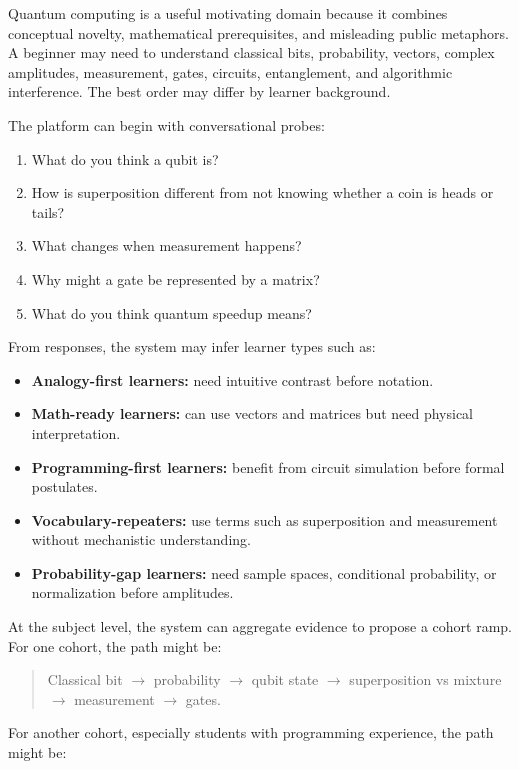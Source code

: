 \documentclass[11pt]{article}
\begin{document}
Quantum computing is a useful motivating domain because it combines conceptual novelty, mathematical prerequisites, and misleading public metaphors. A beginner may need to understand classical bits, probability, vectors, complex amplitudes, measurement, gates, circuits, entanglement, and algorithmic interference. The best order may differ by learner background.

The platform can begin with conversational probes:

\begin{enumerate}[leftmargin=*]
  \item What do you think a qubit is?
  \item How is superposition different from not knowing whether a coin is heads or tails?
  \item What changes when measurement happens?
  \item Why might a gate be represented by a matrix?
  \item What do you think quantum speedup means?
\end{enumerate}

From responses, the system may infer learner types such as:

\begin{itemize}[leftmargin=*]
  \item \textbf{Analogy-first learners:} need intuitive contrast before notation.
  \item \textbf{Math-ready learners:} can use vectors and matrices but need physical interpretation.
  \item \textbf{Programming-first learners:} benefit from circuit simulation before formal postulates.
  \item \textbf{Vocabulary-repeaters:} use terms such as superposition and measurement without mechanistic understanding.
  \item \textbf{Probability-gap learners:} need sample spaces, conditional probability, or normalization before amplitudes.
\end{itemize}

At the subject level, the system can aggregate evidence to propose a cohort ramp. For one cohort, the path might be:

\begin{quote}
Classical bit $\rightarrow$ probability $\rightarrow$ qubit state $\rightarrow$ superposition vs mixture $\rightarrow$ measurement $\rightarrow$ gates.
\end{quote}

For another cohort, especially students with programming experience, the path might be:
\end{document}
